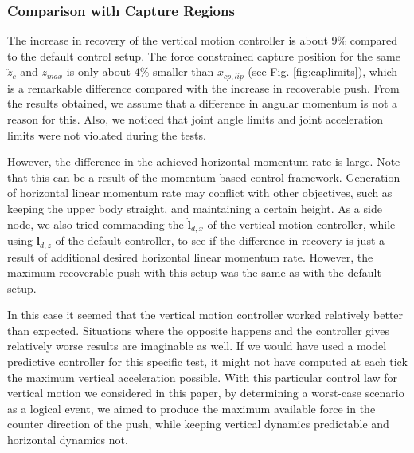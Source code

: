 \documentclass[letterpaper, 10 pt, conference]{ieeeconf}  %
\newcommand{\zmax}{z_{max}}
\begin{document}
\subsubsection{Comparison with Capture Regions}
The increase in recovery of the vertical motion controller is about $9\%$ compared to the default control setup. The force constrained capture position for the same $\ddot{z}_c$ and $\zmax$ is only about $4\%$ smaller than $x_{cp,lip}$ (see Fig. \ref{fig:caplimits}), which is a remarkable difference compared with the increase in recoverable push. From the results obtained, we assume that a difference in angular momentum is not a reason for this. Also, we noticed that joint angle limits and joint acceleration limits were not violated during the tests. 

However, the difference in the achieved horizontal momentum rate is large. Note that this can be a result of the momentum-based control framework. Generation of horizontal linear momentum rate may conflict with other objectives, such as keeping the upper body straight, and maintaining a certain height. As a side node, we also tried commanding the $\dot{\mathbf{l}}_{d,x}$ of the vertical motion controller, while using $\dot{\mathbf{l}}_{d,z}$ of the default controller, to see if the difference in recovery is just a result of additional desired horizontal linear momentum rate. However, the maximum recoverable push with this setup was the same as with the default setup.

In this case it seemed that the vertical motion controller worked relatively better than expected. Situations where the opposite happens and the controller gives relatively worse results are imaginable as well. If we would have used a model predictive controller for this specific test, it might not have computed at each tick the maximum vertical acceleration possible. With this particular control law for vertical motion we considered in this paper, by determining a worst-case scenario as a logical event, we aimed to produce the maximum available force in the counter direction of the push, while keeping vertical dynamics predictable and horizontal dynamics not.

\end{document}
